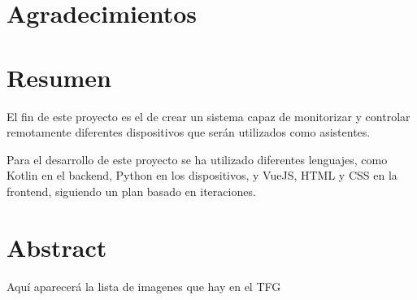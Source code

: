 \documentclass[openright,twoside,10pt]{book}
\begin{document}
\chapter*{Agradecimientos} %


\chapter*{Resumen} %
\begin{flushleft}

El fin de este proyecto es el de crear un sistema capaz de monitorizar y controlar remotamente diferentes dispositivos que serán utilizados como asistentes.

Para el desarrollo de este proyecto se ha utilizado diferentes lenguajes, como Kotlin en el backend, Python en los dispositivos, y VueJS, HTML y CSS en la frontend, siguiendo un plan basado en iteraciones.


\end{flushleft}

\chapter*{Abstract} %
\begin{flushleft}


\end{flushleft}

\tableofcontents %

\cleardoublepage
{} %
\listoffigures %

Aquí aparecerá la lista de imagenes que hay en el TFG

\cleardoublepage
{} %
\listoftables %
\end{document}
